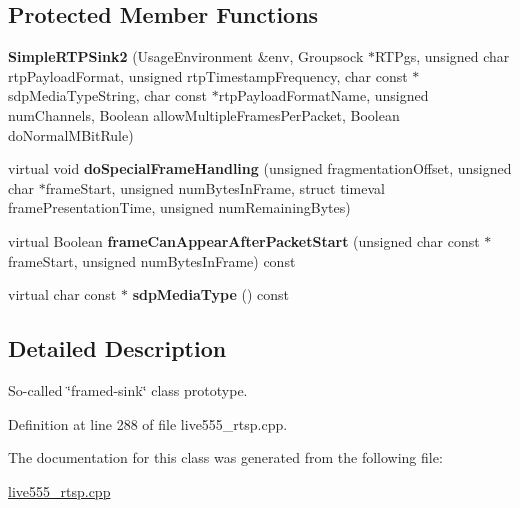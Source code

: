 \subsection*{Protected Member Functions}
\begin{DoxyCompactItemize}
\item 
{\bfseries Simple\+R\+T\+P\+Sink2} (Usage\+Environment \&env, Groupsock $\ast$R\+T\+Pgs, unsigned char rtp\+Payload\+Format, unsigned rtp\+Timestamp\+Frequency, char const $\ast$sdp\+Media\+Type\+String, char const $\ast$rtp\+Payload\+Format\+Name, unsigned num\+Channels, Boolean allow\+Multiple\+Frames\+Per\+Packet, Boolean do\+Normal\+M\+Bit\+Rule)\hypertarget{classSimpleRTPSink2_a5c5c15ff735a1eb853d1e12d1234de45}{}\label{classSimpleRTPSink2_a5c5c15ff735a1eb853d1e12d1234de45}

\item 
virtual void {\bfseries do\+Special\+Frame\+Handling} (unsigned fragmentation\+Offset, unsigned char $\ast$frame\+Start, unsigned num\+Bytes\+In\+Frame, struct timeval frame\+Presentation\+Time, unsigned num\+Remaining\+Bytes)\hypertarget{classSimpleRTPSink2_ac881249a2455ec652d3048bd2fa99210}{}\label{classSimpleRTPSink2_ac881249a2455ec652d3048bd2fa99210}

\item 
virtual Boolean {\bfseries frame\+Can\+Appear\+After\+Packet\+Start} (unsigned char const $\ast$frame\+Start, unsigned num\+Bytes\+In\+Frame) const \hypertarget{classSimpleRTPSink2_a44857fb012b6482acd8ee79ec5e3e122}{}\label{classSimpleRTPSink2_a44857fb012b6482acd8ee79ec5e3e122}

\item 
virtual char const $\ast$ {\bfseries sdp\+Media\+Type} () const \hypertarget{classSimpleRTPSink2_ab60aabf51210a2491193c791031d2642}{}\label{classSimpleRTPSink2_ab60aabf51210a2491193c791031d2642}

\end{DoxyCompactItemize}


\subsection{Detailed Description}
So-\/called \char`\"{}framed-\/sink\char`\"{} class prototype. 

Definition at line 288 of file live555\+\_\+rtsp.\+cpp.



The documentation for this class was generated from the following file\+:\begin{DoxyCompactItemize}
\item 
\hyperlink{live555__rtsp_8cpp}{live555\+\_\+rtsp.\+cpp}\end{DoxyCompactItemize}
